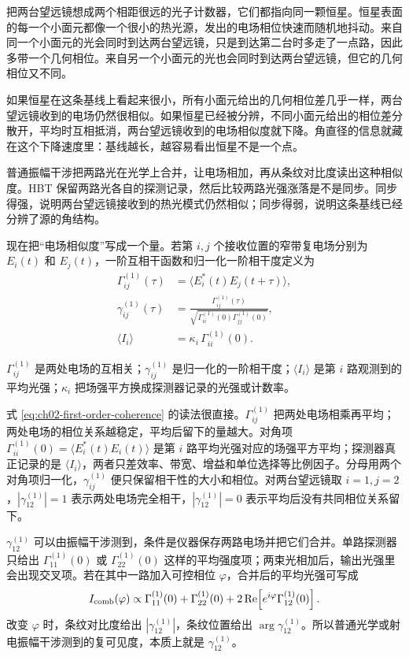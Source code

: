 把两台望远镜想成两个相距很远的光子计数器，它们都指向同一颗恒星。恒星表面的每一个小面元都像一个很小的热光源，发出的电场相位快速而随机地抖动。来自同一个小面元的光会同时到达两台望远镜，只是到达第二台时多走了一点路，因此多带一个几何相位。来自另一个小面元的光也会同时到达两台望远镜，但它的几何相位又不同。

如果恒星在这条基线上看起来很小，所有小面元给出的几何相位差几乎一样，两台望远镜收到的电场仍然很相似。如果恒星已经被分辨，不同小面元给出的相位差分散开，平均时互相抵消，两台望远镜收到的电场相似度就下降。角直径的信息就藏在这个下降速度里：基线越长，越容易看出恒星不是一个点。

普通振幅干涉把两路光在光学上合并，让电场相加，再从条纹对比度读出这种相似度。HBT 保留两路光各自的探测记录，然后比较两路光强涨落是不是同步。同步得强，说明两台望远镜接收到的热光模式仍然相似；同步得弱，说明这条基线已经分辨了源的角结构。

现在把“电场相似度”写成一个量。若第 \(i,j\) 个接收位置的窄带复电场分别为 \(E_i(t)\) 和 \(E_j(t)\)，一阶互相干函数和归一化一阶相干度定义为
\begin{equation}
  \begin{aligned}
    \Gamma^{(1)}_{ij}(\tau)
    &=
    \langle E_i^*(t)E_j(t+\tau)\rangle,\\
    \gamma^{(1)}_{ij}(\tau)
    &=
    \frac{\Gamma^{(1)}_{ij}(\tau)}
         {\sqrt{\Gamma^{(1)}_{ii}(0)\Gamma^{(1)}_{jj}(0)}},\\
    \langle I_i\rangle
    &=
    \kappa_i\,\Gamma^{(1)}_{ii}(0).
  \end{aligned}
  \label{eq:ch02-first-order-coherence}
\end{equation}
\begin{formulaexplain}
\(\Gamma^{(1)}_{ij}\) 是两处电场的互相关；\(\gamma^{(1)}_{ij}\) 是归一化的一阶相干度；\(\langle I_i\rangle\) 是第 \(i\) 路观测到的平均光强；\(\kappa_i\) 把场强平方换成探测器记录的光强或计数率。
\end{formulaexplain}
式 \eqref{eq:ch02-first-order-coherence} 的读法很直接。\(\Gamma^{(1)}_{ij}\) 把两处电场相乘再平均；两处电场的相位关系越稳定，平均后留下的量越大。对角项 \(\Gamma^{(1)}_{ii}(0)=\langle E_i^*(t)E_i(t)\rangle\) 是第 \(i\) 路平均光强对应的场强平方平均；探测器真正记录的是 \(\langle I_i\rangle\)，两者只差效率、带宽、增益和单位选择等比例因子。分母用两个对角项归一化，\(\gamma^{(1)}_{ij}\) 便只保留相干性的大小和相位。对两台望远镜取 \(i=1,j=2\)，\(|\gamma^{(1)}_{12}|=1\) 表示两处电场完全相干，\(|\gamma^{(1)}_{12}|=0\) 表示平均后没有共同相位关系留下。

\(\gamma^{(1)}_{12}\) 可以由振幅干涉测到，条件是仪器保存两路电场并把它们合并。单路探测器只给出 \(\Gamma^{(1)}_{11}(0)\) 或 \(\Gamma^{(1)}_{22}(0)\) 这样的平均强度项；两束光相加后，输出光强里会出现交叉项。若在其中一路加入可控相位 \(\varphi\)，合并后的平均光强可写成
\[
  I_{\rm comb}(\varphi)
  \propto
  \Gamma^{(1)}_{11}(0)+\Gamma^{(1)}_{22}(0)
  +2\,{\rm Re}\!\left[e^{i\varphi}\Gamma^{(1)}_{12}(0)\right].
\]
改变 \(\varphi\) 时，条纹对比度给出 \(|\gamma^{(1)}_{12}|\)，条纹位置给出 \(\arg\gamma^{(1)}_{12}\)。所以普通光学或射电振幅干涉测到的复可见度，本质上就是 \(\gamma^{(1)}_{12}\)。

